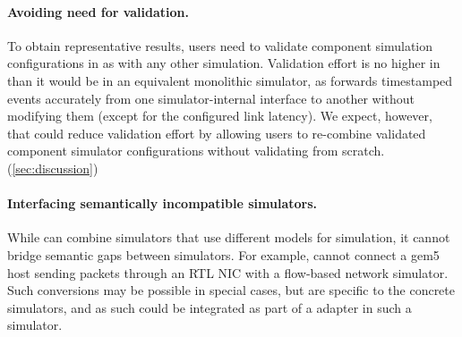 \paragraph{Avoiding need for validation.}
To obtain representative results, users need to validate component
simulation configurations in \sysname as with any other simulation.
%
Validation effort is no higher in \sysname than it would be in an
equivalent monolithic simulator, as \sysname forwards timestamped
events accurately from one simulator-internal interface to another
without modifying them (except for the configured link latency).
%
We expect, however, that \sysname could reduce validation effort by
allowing users to re-combine validated component simulator
configurations without validating from scratch.
(\autoref{sec:discussion})

\paragraph{Interfacing semantically incompatible simulators.}
While \sysname can combine simulators that use different models for
simulation, it cannot bridge semantic gaps between simulators.
%
For example, \sysname cannot connect a gem5 host sending packets
through an RTL NIC with a flow-based network simulator.
%
Such conversions may be possible in special cases, but are specific to
the concrete simulators, and as such could be integrated as part of a
\sysname adapter in such a simulator.
